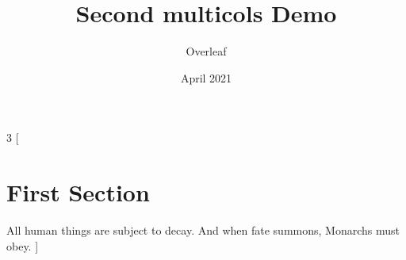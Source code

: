 \documentclass{article}
\title{Second multicols Demo}
\author{Overleaf}
\date{April 2021}
\begin{document}
\maketitle

\begin{multicols}{3}
[
\section{First Section}
All human things are subject to decay. And when fate summons, Monarchs must obey.
]
\blindtext\blindtext
\end{multicols}
\end{document}
